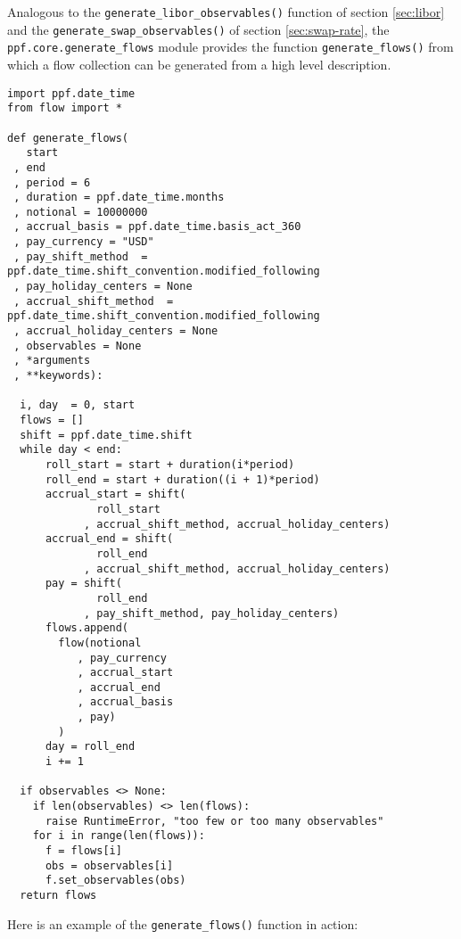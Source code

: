 Analogous to the \verb|generate_libor_observables()| function of
section \ref{sec:libor} and the \verb|generate_swap_observables()| of
section \ref{sec:swap-rate}, the \verb|ppf.core.generate_flows| module
provides the function \verb|generate_flows()| from which a flow
collection can be generated from a high level description.
\begin{verbatim}
import ppf.date_time
from flow import *

def generate_flows(
   start
 , end
 , period = 6
 , duration = ppf.date_time.months
 , notional = 10000000
 , accrual_basis = ppf.date_time.basis_act_360
 , pay_currency = "USD"
 , pay_shift_method  = ppf.date_time.shift_convention.modified_following
 , pay_holiday_centers = None
 , accrual_shift_method  = ppf.date_time.shift_convention.modified_following
 , accrual_holiday_centers = None
 , observables = None
 , *arguments
 , **keywords):

  i, day  = 0, start
  flows = []
  shift = ppf.date_time.shift
  while day < end:
      roll_start = start + duration(i*period)
      roll_end = start + duration((i + 1)*period) 
      accrual_start = shift(
              roll_start
            , accrual_shift_method, accrual_holiday_centers)
      accrual_end = shift(
              roll_end
            , accrual_shift_method, accrual_holiday_centers)
      pay = shift(
              roll_end
            , pay_shift_method, pay_holiday_centers)
      flows.append(
        flow(notional
           , pay_currency
           , accrual_start
           , accrual_end
           , accrual_basis
           , pay)
        )
      day = roll_end
      i += 1
      
  if observables <> None:
    if len(observables) <> len(flows):
      raise RuntimeError, "too few or too many observables"
    for i in range(len(flows)):
      f = flows[i]
      obs = observables[i]
      f.set_observables(obs)
  return flows
\end{verbatim}
Here is an example of the \verb|generate_flows()| function in action:
